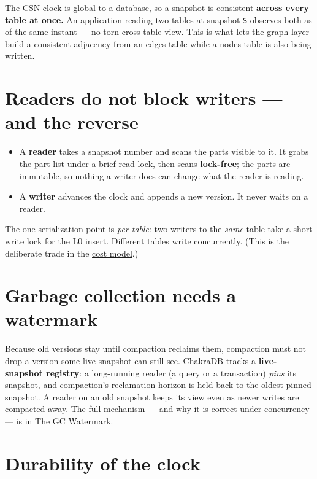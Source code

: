 \documentclass[
  11pt,
  openany]{book}
\providecommand{\tightlist}{%
  \setlength{\itemsep}{0pt}\setlength{\parskip}{0pt}}
\begin{document}
The CSN clock is global to a database, so a snapshot is consistent
\textbf{across every table at once.} An application reading two tables
at snapshot \texttt{S} observes both as of the same instant --- no torn
cross-table view. This is what lets the graph layer build a consistent
adjacency from an edges table while a nodes table is also being written.

\section{Readers do not block writers --- and the
reverse}\label{readers-do-not-block-writers-and-the-reverse}

\begin{itemize}
\tightlist
\item
  A \textbf{reader} takes a snapshot number and scans the parts visible
  to it. It grabs the part list under a brief read lock, then scans
  \textbf{lock-free}; the parts are immutable, so nothing a writer does
  can change what the reader is reading.
\item
  A \textbf{writer} advances the clock and appends a new version. It
  never waits on a reader.
\end{itemize}

The one serialization point is \emph{per table}: two writers to the
\emph{same} table take a short write lock for the L0 insert. Different
tables write concurrently. (This is the deliberate trade in the
\href{../introduction/introduction.md}{cost model}.)

\section{Garbage collection needs a
watermark}\label{garbage-collection-needs-a-watermark}

Because old versions stay until compaction reclaims them, compaction
must not drop a version some live snapshot can still see. ChakraDB
tracks a \textbf{live-snapshot registry}: a long-running reader (a query
or a transaction) \emph{pins} its snapshot, and compaction's reclamation
horizon is held back to the oldest pinned snapshot. A reader on an old
snapshot keeps its view even as newer writes are compacted away. The
full mechanism --- and why it is correct under concurrency --- is in The
GC Watermark.

\section{Durability of the clock}\label{durability-of-the-clock}
\end{document}
